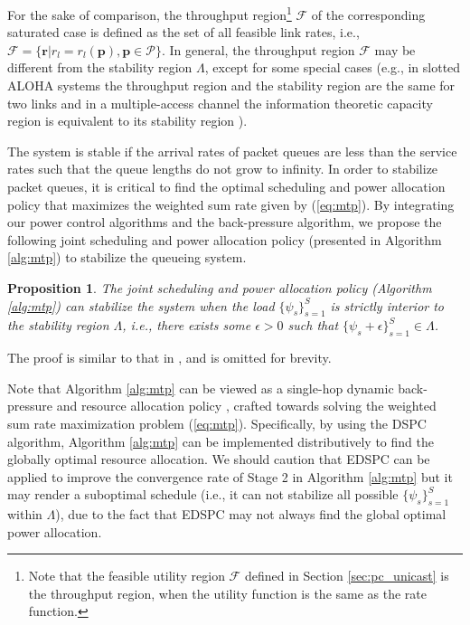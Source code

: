 \documentclass[10pt,journal,letterpaper,compsoc]{IEEEtran}
\newtheorem{prop}{\textbf{Proposition}}[section]
\begin{document}
{{For the sake of comparison, the throughput region\footnote{Note that the feasible utility region $\mathcal{F}$ defined in Section \ref{sec:pc_unicast} is the throughput region, when the utility function is the same as the rate function.} $\mathcal{F}$ of the corresponding saturated case is defined as the set of all feasible link rates, i.e., $\mathcal{F}=\{\mathbf{r}|r_l=r_l(\mathbf{p}), \mathbf{p}\in\mathcal{P}\}$. In general, the throughput region $\mathcal{F}$ may be different from the stability region $\Lambda$, except for some special cases (e.g., in slotted ALOHA systems the throughput region and the stability region are the same \cite{rao:1988} for two links and in a multiple-access channel the information theoretic capacity region is equivalent to its stability region \cite{parande:2008}).


The system is stable if the arrival rates of packet queues are less than the service rates such that the queue lengths do not grow to infinity. In order to stabilize packet queues, it is critical to find the optimal scheduling and power allocation policy that maximizes the weighted sum rate given by (\ref{eq:mtp}). By integrating our power control algorithms and the back-pressure algorithm, we propose the following joint scheduling and power allocation policy (presented in Algorithm \ref{alg:mtp}) to stabilize the queueing system.


\begin{prop}
The joint scheduling and power allocation policy (Algorithm \ref{alg:mtp}) can stabilize the system when the load $\{\psi_s\}_{s=1}^S$ is strictly interior to the stability region $\Lambda$, i.e., there exists some $\epsilon>0$ such that $\{\psi_s+\epsilon\}_{s=1}^S\in\Lambda$.
\end{prop}

The proof is similar to that in \cite{neely:2005,neely:2006}, and is omitted for brevity.

Note that Algorithm \ref{alg:mtp} can be viewed as a single-hop  dynamic back-pressure and resource allocation policy \cite{neely:2006},
crafted towards solving the weighted sum rate maximization problem (\ref{eq:mtp}). Specifically,
by using the DSPC algorithm, Algorithm \ref{alg:mtp} can be implemented distributively to find the globally optimal resource allocation.
We should caution that EDSPC can be applied to improve the convergence rate of Stage 2 in Algorithm \ref{alg:mtp} but it may render a suboptimal schedule (i.e., it can not stabilize all possible $\{\psi_s\}_{s=1}^S$ within $\Lambda$), due to the fact that EDSPC may not always find the global optimal power allocation.

}}
\end{document}
